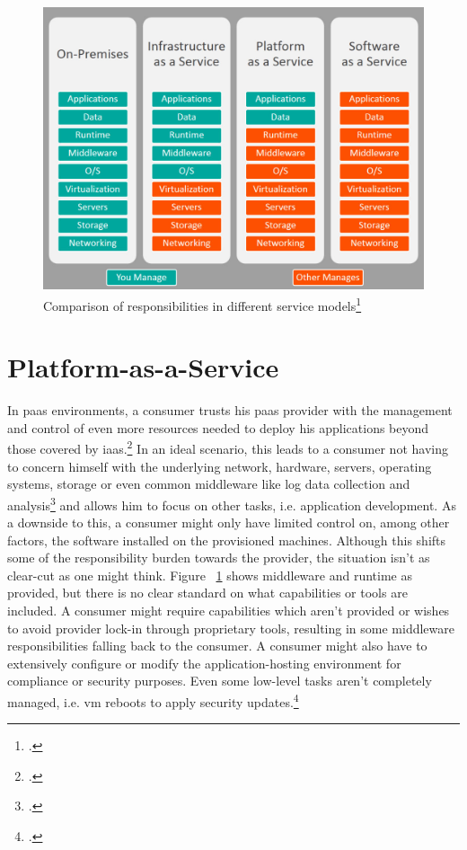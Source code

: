 \begin{figure}[H]
\includegraphics[scale=0.4]{pictures/ServiceComparison.jpg} 
\caption{Comparison of responsibilities in different service models\protect\footcite[][, section 'Original reference image']{servicecomparison}}
\label{fig:servicecomparison}
\end{figure}

\section{Platform-as-a-Service}

In \gls{paas} environments, a consumer trusts his \gls{paas} provider with the management and control of even more resources needed to deploy his applications beyond those covered by \gls{iaas}.\footcite[][p. 2 to 3]{nistcloud}
In an ideal scenario, this leads to a consumer not having to concern himself with the underlying network, hardware, servers, operating systems, storage or even common middleware like log data collection and analysis\footcite[][, section 'Advantages of PaaS']{msPaas} and allows him to focus on other tasks, i.e. application development.
As a downside to this, a consumer might only have limited control on, among other factors, the software installed on the provisioned machines. 
Although this shifts some of the responsibility burden towards the provider, the situation isn't as clear-cut as one might think. 
Figure ~\ref{fig:servicecomparison} shows middleware and runtime as provided, but there is no clear standard on what capabilities or tools are included.
A consumer might require capabilities which aren't provided or wishes to avoid provider lock-in through proprietary tools, 
resulting in some middleware responsibilities falling back to the consumer. 
A consumer might also have to extensively configure or modify the application-hosting environment for compliance or security purposes. 
Even some low-level tasks aren't completely managed, i.e. \gls{vm} reboots to apply security updates.\footcite[][, section 'Process Linux node updates and reboots using kured']{msVmReboot}

